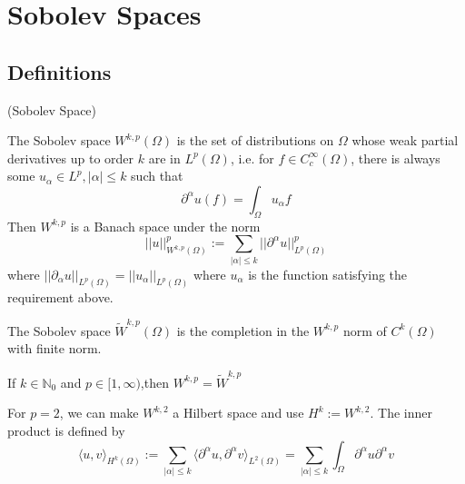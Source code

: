 \section{Sobolev Spaces}

\subsection{Definitions}

\begin{definition}
    (Sobolev Space)\par
    The Sobolev space $W^{k,p}(\Omega)$ is the set of distributions on $\Omega$ whose weak partial derivatives up to order $k$ are in $L^p(\Omega)$, i.e. for $f\in C^{\infty}_c(\Omega)$, there is always some $u_\alpha \in L^p, |\alpha| \leq k$ such that
    \[
    \partial^{\alpha}u(f) = \int_{\Omega} u_{\alpha}f
    \]
    Then $W^{k,p}$ is a Banach space under the norm
    \[
    ||u||^p_{W^{k,p}(\Omega)}:= \sum\limits_{|\alpha|\leq k}||\partial^{\alpha} u||^p_{L^p(\Omega)}
    \]
    where $||\partial_{\alpha} u||_{L^p(\Omega)} = ||u_{\alpha}||_{L^p(\Omega)}$ where $u_{\alpha}$ is the function satisfying the requirement above.
\end{definition}

\begin{definition}
    The Sobolev space $\widetilde{W}^{k,p}(\Omega)$ is the completion in the $W^{k,p}$ norm of $C^k(\Omega)$ with finite norm.
\end{definition}

\begin{proposition}
    If $k\in \mathbb{N}_0$ and $p\in[1,\infty)$,then $W^{k,p} = \widetilde{W}^{k,p}$
\end{proposition}

\begin{definition}
    For $p=2$, we can make $W^{k,2}$ a Hilbert space and use $H^k:= W^{k,2}$. The inner product is defined by
    \[
    \langle u,v\rangle_{H^k(\Omega)}:=\sum\limits_{|\alpha|\leq k}\langle \partial^{\alpha} u, \partial^{\alpha} v\rangle_{L^2(\Omega)} = \sum\limits_{|\alpha| \leq k} \int_{\Omega} \partial^{\alpha} u \partial^{\alpha} v
    \]
\end{definition}


